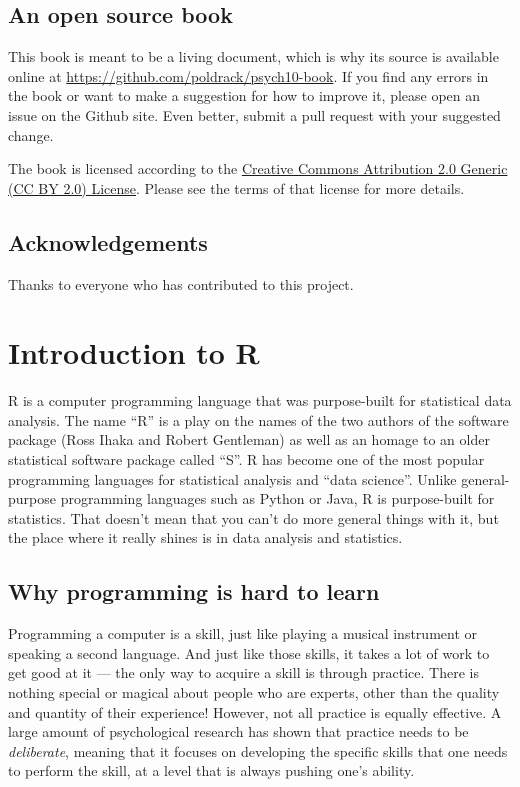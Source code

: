 \documentclass[12pt,]{book}
\begin{document}
\hypertarget{an-open-source-book}{%
\section{An open source book}\label{an-open-source-book}}

This book is meant to be a living document, which is why its source is available online at \url{https://github.com/poldrack/psych10-book}. If you find any errors in the book or want to make a suggestion for how to improve it, please open an issue on the Github site. Even better, submit a pull request with your suggested change.

The book is licensed according to the \href{https://creativecommons.org/licenses/by/2.0/}{Creative Commons Attribution 2.0 Generic (CC BY 2.0) License}. Please see the terms of that license for more details.

\hypertarget{acknowledgements}{%
\section{Acknowledgements}\label{acknowledgements}}

Thanks to everyone who has contributed to this project.

\hypertarget{introduction-to-r}{%
\chapter{Introduction to R}\label{introduction-to-r}}

R is a computer programming language that was purpose-built for statistical data analysis.
The name ``R'' is a play on the names of the two authors of the software package (Ross Ihaka and Robert Gentleman) as well as an homage to an older statistical software package called ``S''.
R has become one of the most popular programming languages for statistical analysis and ``data science''. Unlike general-purpose programming languages such as Python or Java, R is purpose-built for statistics. That doesn't mean that you can't do more general things with it, but the place where it really shines is in data analysis and statistics.

\hypertarget{why-programming-is-hard-to-learn}{%
\section{Why programming is hard to learn}\label{why-programming-is-hard-to-learn}}

Programming a computer is a skill, just like playing a musical instrument or speaking a second language. And just like those skills, it takes a lot of work to get good at it --- the only way to acquire a skill is through practice. There is nothing special or magical about people who are experts, other than the quality and quantity of their experience! However, not all practice is equally effective. A large amount of psychological research has shown that practice needs to be \emph{deliberate}, meaning that it focuses on developing the specific skills that one needs to perform the skill, at a level that is always pushing one's ability.
\end{document}
